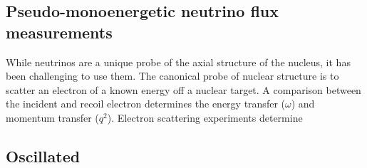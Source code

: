 \subsection{Pseudo-monoenergetic neutrino flux measurements}
\label{sec:mono}


While neutrinos are a unique probe of the axial structure of the nucleus, it has been challenging to use them. The canonical probe of nuclear structure is to scatter an electron of a known energy off a nuclear target. A comparison between the incident and recoil electron determines the energy transfer ($\omega$) and momentum transfer ($q^2$). Electron scattering experiments determine 






\subsection{Oscillated }
\label{sec:oscd}

